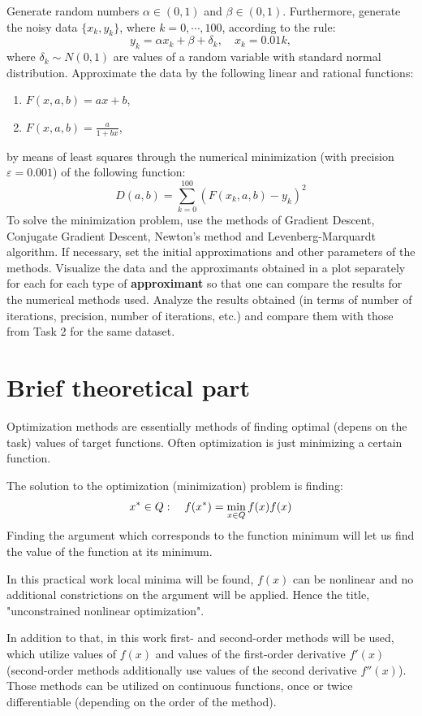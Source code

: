\documentclass[12pt, a4paper]{article}
\begin{document}
Generate random numbers $\alpha \in (0, 1)$ and $\beta \in (0, 1)$. Furthermore, generate the noisy data $\{ x_k, y_k \}$, where $k = 0, \cdots, 100$, according to the rule:
\[ y_k = \alpha x_k + \beta + \delta_k, \quad x_k = 0.01 k, \]
where $\delta_k \sim N(0, 1)$ are values of a random variable with standard normal distribution. Approximate the data by the following linear and rational functions:
\begin{enumerate}
	\item $F(x, a, b) = ax + b$,
	\item $F(x, a, b) = \frac{a}{1+bx}$,
\end{enumerate}
by means of least squares through the numerical minimization (with precision $\varepsilon = 0.001$) of the following function:
\[ D(a, b) = \sum_{k=0}^{100} \left( F(x_k, a, b) - y_k \right)^2 \]
To solve the minimization problem, use the methods of Gradient Descent, Conjugate Gradient Descent, Newton's method and Levenberg-Marquardt algorithm. If necessary, set the initial approximations and other parameters of the methods. Visualize the data and the approximants obtained in a plot separately for each for each type of \textbf{approximant} so that one can compare the results for the numerical methods used. Analyze the results obtained (in terms of number of iterations, precision, number of iterations, etc.) and compare them with those from Task 2 for the same dataset.

\newpage

\section*{Brief theoretical part}

Optimization methods are essentially methods of finding optimal (depens on the task) values of target functions. Often optimization is just minimizing a certain function.

The solution to the optimization (minimization) problem is finding:
\[ x^* \in Q: \quad f(x^*) = \min_{x\in Q} f(x) \def \arg \min_{x\in Q} f(x) \]
Finding the argument which corresponds to the function minimum will let us find the value of the function at its minimum.

In this practical work local minima will be found, $f(x)$ can be nonlinear and no additional constrictions on the argument will be applied. Hence the title, "unconstrained nonlinear optimization".

In addition to that, in this work first- and second-order methods will be used, which utilize values of $f(x)$ and values of the first-order derivative $f'(x)$ (second-order methods additionally use values of the second derivative $f''(x)$). Those methods can be utilized on continuous functions, once or twice differentiable (depending on the order of the method).
\end{document}
